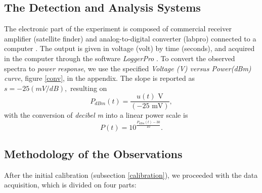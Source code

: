 \bigskip


\subsection{The Detection and Analysis Systems}\label{detection_system}

The electronic part of the experiment is composed of commercial receiver amplifier (satellite finder)  and analog-to-digital converter (labpro) connected to a computer \cite{sbu}. The output is given in voltage (volt) by time (seconds), and acquired in the computer through the software {\it LoggerPro} \cite{loggerpro}. To convert the observed spectra to {\it power response}, we use the specified {\it Voltage (V) versus Power(dBm) curve}, figure \ref{conv}, in the appendix. The slope is reported as  $s = - 25(mV/dB),$ resulting on
\begin{equation}
P_{dBm} (t)  = \frac{u(t) \mbox{ V}}{(-25 \mbox{ mV})},
\label{pdb}
\end{equation}
with the conversion of {\it decibel m} into a linear power scale is
\begin{equation}
P (t)  = 10^{\frac{P_{dBm}(t) - 30}{10}}.
\label{pdb2}
\end{equation}




\bigskip

\subsection{Methodology of the Observations}\label{observations}

After the initial calibration (subsection \ref{calibration}), we proceeded with the data acquisition, which is divided on four parts:

